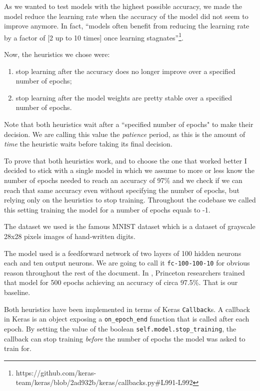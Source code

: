 As we wanted to test models with the highest possible accuracy, we made
the model reduce the learning rate when the accuracy of the model
did not seem to improve anymore. In fact, ``models often benefit from
reducing the learning rate by a factor of [2 up to 10 times] once
learning
stagnates''\footnote{https://github.com/keras-team/keras/blob/2ad932b/keras/callbacks.py\#L991-L992}.

Now, the heuristics we chose were:
\begin{enumerate}
  \item stop learning after the accuracy does no longer improve over a
    specified number of epochs;
  \item stop learning after the model weights are pretty stable over a
    specified number of epochs.
\end{enumerate}

Note that both heuristics wait after a ``specified number of
epochs" to make their decision. We are calling this value the
\emph{patience} period, as this is the amount of \emph{time} the heuristic waits
before taking its final decision.

To prove that both heuristics work, and to choose the one that
worked better I decided to stick with a single model in which we assume
to more or less know the number of epochs needed to reach an accuracy
of 97\% and we check if we can reach that same accuracy even without
specifying the number of epochs, but relying only on the heuristics to
stop training. Throughout the codebase we called this setting training
the model for a number of epochs equals to -1.

The dataset we used is the famous MNIST dataset which is a dataset of
grayscale 28x28 pixels images of hand-written digits.

The model used is a feedforward network of two layers of 100 hidden
neurons each and ten output neurons. We are going to call it
\texttt{fc-100-100-10} for obvious reason throughout the rest of the
document. In \cite{bhagoji2018enhancing}, Princeton researchers trained
that model for 500 epochs achieving an accuracy of circa 97.5\%. That is our
baseline.

Both heuristics have been implemented in terms of Keras
\texttt{Callback}s. A callback in Keras is an object exposing a
\texttt{on\_epoch\_end} function that is called after each epoch. By
setting the value of the boolean \texttt{self.model.stop\_training}, the
callback can stop training \emph{before} the number of epochs the model
was asked to train for.


